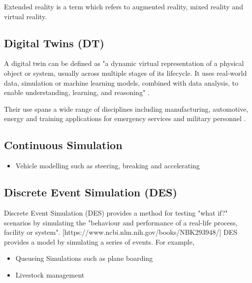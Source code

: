\documentclass{article}
\begin{document}
Extended reality is a term which refers to augmented reality, mixed reality and virtual reality. 

\subsection{Digital Twins (DT)}

A digital twin can be defined as "a dynamic virtual representation of a physical object or system, usually across multiple stages of its lifecycle. It uses real-world data, simulation or machine learning models, combined with data analysis, to enable understanding, learning, and reasoning" \cite{stanford2019digital}. 

Their use spans a wide range of disciplines including manufacturing, automotive, energy \cite{PYLIANIDIS2021105942}
 and training applications for emergency services \cite{ScientificReports1} and military personnel \cite{9345490}. 

\subsection{Continuous Simulation}


\begin{itemize}
  \item Vehicle modelling such as steering, breaking and accelerating
\end{itemize}

\subsection{Discrete Event Simulation (DES)}



Discrete Event Simulation (DES) provides a method for testing "what if?" scenarios by simulating the "behaviour and performance of a real-life process, facility or system". [https://www.ncbi.nlm.nih.gov/books/NBK293948/] DES provides a model by simulating a series of events. For example, 

\begin{itemize}
  \item Queueing Simulations such as plane boarding
  \item Livestock management
\end{itemize}
\end{document}
